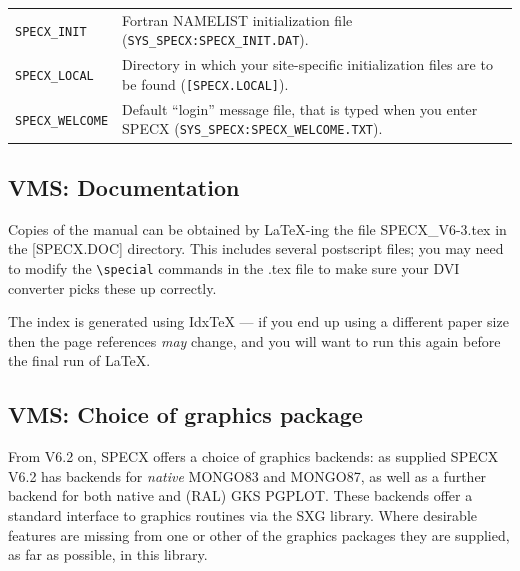 \documentclass[11pt,twoside]{report}
\begin{document}
\begin{tabular}{ll}
\verb+SPECX_INIT+ &     \begin{minipage}[t]{4.5in}
                        Fortran NAMELIST initialization file
                        (\verb+SYS_SPECX:SPECX_INIT.DAT+).
                        \end{minipage}\\
\verb+SPECX_LOCAL+ &    \begin{minipage}[t]{4.5in}
                        Directory in which your site-specific initialization
                        files are to be found (\verb+[SPECX.LOCAL]+).
                        \end{minipage}\\
\verb+SPECX_WELCOME+ &  \begin{minipage}[t]{4.5in}
                        Default ``login'' message file, that is typed when
                        you enter SPECX (\verb+SYS_SPECX:SPECX_WELCOME.TXT+).
                        \end{minipage}\\
\end{tabular}

\subsection{VMS: Documentation}

Copies of the manual can be obtained by {\LaTeX}-ing the file
SPECX\_V6-3.tex in the [SPECX.DOC] directory. This includes
several postscript files; you may need to modify the \verb+\special+
commands in the .tex file to make sure your DVI converter picks
these up correctly.

The index is generated using Idx{\TeX} --- if you end up using a
different paper size then the page references {\em may} change, and
you will want to run this again before the final run of \LaTeX.


\subsection{VMS: Choice of graphics package}

From V6.2 on, SPECX offers a choice of graphics backends: as supplied
SPECX V6.2 has backends for {\em native} MONGO83 and MONGO87, as well
as a further backend for both native and (RAL) GKS PGPLOT. These backends
offer a standard interface to graphics routines via the SXG library. Where
desirable features are missing from one or other of the graphics packages
they are supplied, as far as possible, in this library.
\end{document}
